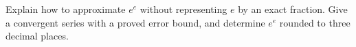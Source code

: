 Explain how to approximate $e^e$ without representing $e$ by an exact fraction. Give a convergent series with a proved error bound, and determine $e^e$ rounded to three decimal places.
